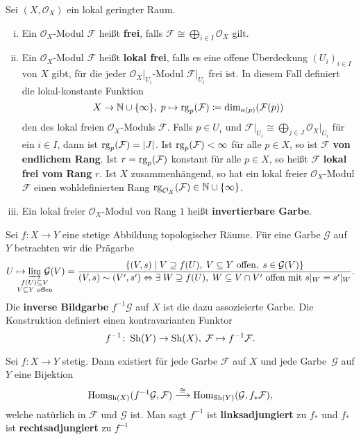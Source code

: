 \begin{defn}
	Sei $(X, \mathcal{O}_X)$ ein lokal geringter Raum.
	\begin{enumerate}[i)]
		\item Ein $\mathcal{O}_X$-Modul $\mathcal{F}$ heißt \textbf{frei}, falls $\mathcal{F} \cong \bigoplus_{i\in I}\mathcal{O}_X$ gilt.
		\item Ein $\mathcal{O}_X$-Modul $\mathcal{F}$ heißt \textbf{lokal frei}, falls es eine offene Überdeckung $(U_i)_{i\in I}$ von $X$ gibt, für die jeder $\mathcal{O}_X\vert_{U_i}$-Modul $\mathcal{F}\vert_{U_i}$ frei ist. In diesem Fall definiert die lokal-konstante Funktion
		\[
			X \to \mathbb {N} \cup \{\infty\}, \; p \mapsto \operatorname{rg}_p(\mathcal{F}) \coloneqq \dim_{\kappa(p)}(\mathcal{F}(p))
		\]
		den  des lokal freien $\mathcal{O}_X$-Moduls $\mathcal{F}$. Falls $p \in U_i$ und $\mathcal{F}\vert_{U_i} \cong \bigoplus_{j\in J} \mathcal{O}_X\vert_{U_i}$ für ein $i \in I$, dann ist $\operatorname{rg}_p(\mathcal{F}) = \left \lvert J \right \rvert$.
		Ist $\operatorname{rg}_p(\mathcal{F})< \infty$ für alle $p \in X$, so ist $\mathcal{F}$ \textbf{von endlichem Rang}. Ist $r = \operatorname{rg}_p(\mathcal{F})$ konstant für alle $p \in X$, so heißt $\mathcal{F}$ \textbf{lokal frei vom Rang} $r$. Ist $X$ zusammenhängend, so hat ein lokal freier $\mathcal{O}_X$-Modul $\mathcal{F}$ einen wohldefinierten Rang $\operatorname{rg}_{\mathcal{O}_X}(\mathcal{F}) \in \mathbb {N} \cup \{\infty\}$.
		\item Ein lokal freier $\mathcal{O}_X$-Modul von Rang $1$ heißt \textbf{invertierbare Garbe}.
	\end{enumerate}
\end{defn}

\begin{defn}
	Sei $f\colon X \to Y$ eine stetige Abbildung topologischer Räume. Für eine Garbe $\mathcal{G}$ auf $Y$ betrachten wir die Prägarbe
	\[
		U \mapsto \varinjlim_{\substackclap{f(U)\subseteq V\\V\subseteq Y \text{ offen}}} \, \mathcal{G}(V) = \frac{\{(V,s)\mid V \supseteq f(U),\; V \subseteq Y \text{ offen},\;s\in\mathcal{G}(V)\}}{(V,s)\sim(V',s') \Leftrightarrow \exists \;W \supseteq f(U),\; W \subseteq V \cap V' \text{ offen mit } s\vert_W = s'\vert_W}.
	\]
	Die \textbf{inverse Bildgarbe} $f^{-1}\mathcal{G}$ auf $X$ ist die dazu assozieierte Garbe. Die Konstruktion definiert einen kontravarianten Funktor
	\[
		f^{-1}\colon \operatorname{Sh}(Y) \to \operatorname{Sh}(X),\; \mathcal{F} \mapsto f^{-1}\mathcal{F}. 
	\]
\end{defn}

\begin{prop}
\label{prop:3.5}
	Sei $f\colon X \to Y$ stetig. Dann existiert für jede Garbe $\mathcal{F}$ auf $X$ und jede Garbe~$\mathcal{G}$ auf $Y$ eine Bijektion
	\[
            \operatorname{Hom}_{\operatorname{Sh}(X)}(f^{-1}\mathcal{G},\mathcal{F}) \overset{\cong}{\longrightarrow} \operatorname{Hom}_{\operatorname{Sh}(Y)}(\mathcal{G},f_*\mathcal{F}),
	\]
	welche natürlich in $\mathcal{F}$ und $\mathcal{G}$ ist. Man sagt $f^{-1}$ ist \textbf{linksadjungiert} zu $f_*$ und $f_*$ ist \textbf{rechtsadjungiert} zu $f^{-1}$
\end{prop}

